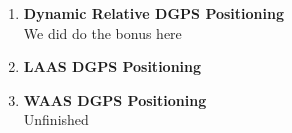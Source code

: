 \documentclass[11pt]{article}
\begin{document}
\begin{enumerate}[label=\textbf{\arabic*.}]
  
  \item \textbf{Dynamic Relative DGPS Positioning} \\
  We did do the bonus here
  \item \textbf{LAAS DGPS Positioning} \\
  \item \textbf{WAAS DGPS Positioning} \\
  Unfinished
  
\end{enumerate}
\end{document}
